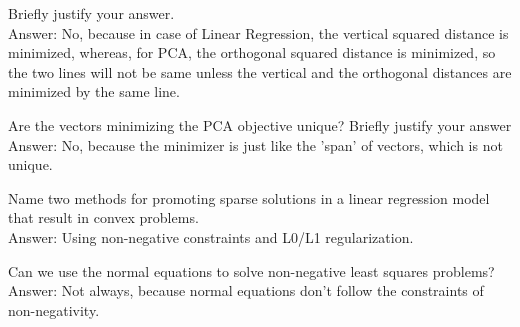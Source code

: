 \documentclass{article}
\def\gre#1{{\color{gre}#1}}
\begin{document}
{ Briefly justify your answer.\\
\gre{Answer: No, because in case of Linear Regression, the vertical squared distance is minimized, whereas, for PCA, the orthogonal squared distance is minimized, so the two lines will not be same unless the vertical and the orthogonal distances are minimized by the same line.}
\item Are the vectors minimizing the PCA objective unique? Briefly justify your answer \\
\gre{Answer: No, because the minimizer is just like the 'span' of vectors, which is not unique. }
\item Name two methods for promoting sparse solutions in a linear regression model that result in convex problems.\\
\gre{Answer: Using non-negative constraints and L0/L1 regularization.}
\item Can we use the normal equations to solve non-negative least squares problems? \\
\gre{Answer: Not always, because normal equations don't follow the constraints of non-negativity.}
}
\end{document}
